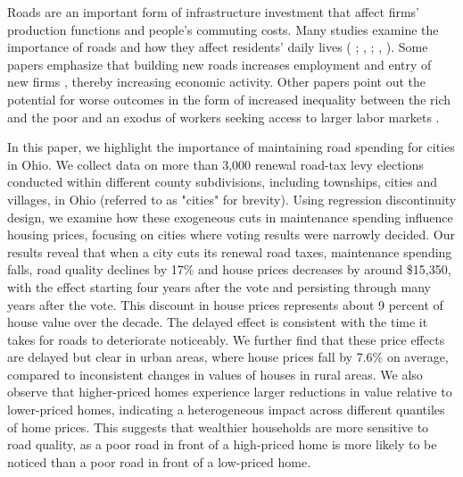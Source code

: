 Roads are an important form of infrastructure investment that affect firms’ production functions and people’s commuting costs. Many studies examine the importance of roads and how they affect residents' daily lives ( \citeyear{currier2023};  \citeyear{adukia2020},  \citeyear{banerjee2020};  \citeyear{banerjee2020},  \citeyear{banerjee2020}). Some papers emphasize that building new roads increases employment and entry of new firms \citep{gibbons2019new}, thereby increasing economic activity. Other papers point out the potential for worse outcomes in the form of increased inequality between the rich and the poor \citep{hettige2006} and an exodus of workers seeking access to larger labor markets \citep{asher2020}.  
 
In this paper, we highlight the importance of maintaining road spending for cities in Ohio. We collect data on more than 3,000 renewal road-tax levy elections conducted within different county subdivisions, including townships, cities and villages, in Ohio (referred to as "cities" for brevity). Using regression discontinuity design, we examine how these exogeneous cuts in maintenance spending influence housing prices, focusing on cities where voting results were narrowly decided. Our results reveal that when a city cuts its renewal road taxes, maintenance spending falls, road quality declines by 17\% and house prices decreases by around \$15,350, with the effect starting four years after the vote and persisting through many years after the vote. This discount in house prices represents about 9 percent of house value over the decade.  The delayed effect is consistent with the time it takes for roads to deteriorate noticeably.  We further find that these price effects are delayed but clear in urban areas, where house prices fall by 7.6\% on average, compared to inconsistent changes in values of houses in rural areas. We also observe that higher-priced homes experience larger reductions in value relative to lower-priced homes, indicating a heterogeneous impact across different quantiles of home prices. This suggests that wealthier households are more sensitive to road quality, as a poor road in front of a high-priced home is more likely to be noticed than a poor road in front of a low-priced home.

